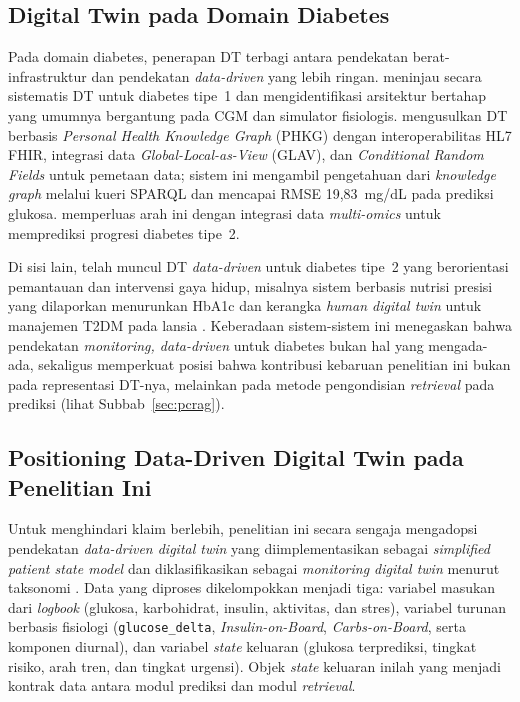 \subsection{Digital Twin pada Domain Diabetes}
Pada domain diabetes, penerapan DT terbagi antara pendekatan berat-infrastruktur dan pendekatan \emph{data-driven} yang lebih ringan. \textcite{cappon2024} meninjau secara sistematis DT untuk diabetes tipe~1 dan mengidentifikasi arsitektur bertahap yang umumnya bergantung pada CGM dan simulator fisiologis. \textcite{rad2024} mengusulkan DT berbasis \emph{Personal Health Knowledge Graph} (PHKG) dengan interoperabilitas HL7 FHIR, integrasi data \emph{Global-Local-as-View} (GLAV), dan \emph{Conditional Random Fields} untuk pemetaan data; sistem ini mengambil pengetahuan dari \emph{knowledge graph} melalui kueri SPARQL dan mencapai RMSE 19,83~mg/dL pada prediksi glukosa. \textcite{zhang2024} memperluas arah ini dengan integrasi data \emph{multi-omics} untuk memprediksi progresi diabetes tipe~2.

Di sisi lain, telah muncul DT \emph{data-driven} untuk diabetes tipe~2 yang berorientasi pemantauan dan intervensi gaya hidup, misalnya sistem berbasis nutrisi presisi yang dilaporkan menurunkan HbA1c \autocite{shamanna2020} dan kerangka \emph{human digital twin} untuk manajemen T2DM pada lansia \autocite{thamotharan2023}. Keberadaan sistem-sistem ini menegaskan bahwa pendekatan \emph{monitoring, data-driven} untuk diabetes bukan hal yang mengada-ada, sekaligus memperkuat posisi bahwa kontribusi kebaruan penelitian ini bukan pada representasi DT-nya, melainkan pada metode pengondisian \emph{retrieval} pada prediksi (lihat Subbab~\ref{sec:pcrag}).

\subsection{Positioning Data-Driven Digital Twin pada Penelitian Ini}
Untuk menghindari klaim berlebih, penelitian ini secara sengaja mengadopsi pendekatan \emph{data-driven digital twin} yang diimplementasikan sebagai \emph{simplified patient state model} dan diklasifikasikan sebagai \emph{monitoring digital twin} menurut taksonomi \textcite{drummond2024}. Data yang diproses dikelompokkan menjadi tiga: variabel masukan dari \emph{logbook} (glukosa, karbohidrat, insulin, aktivitas, dan stres), variabel turunan berbasis fisiologi (\texttt{glucose\_delta}, \emph{Insulin-on-Board}, \emph{Carbs-on-Board}, serta komponen diurnal), dan variabel \emph{state} keluaran (glukosa terprediksi, tingkat risiko, arah tren, dan tingkat urgensi). Objek \emph{state} keluaran inilah yang menjadi kontrak data antara modul prediksi dan modul \emph{retrieval}.

